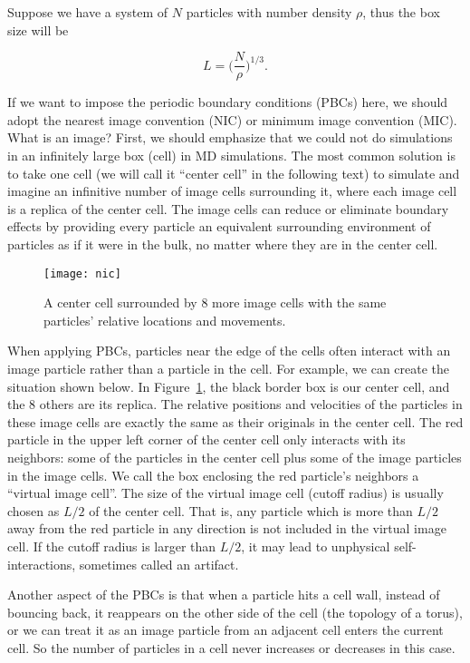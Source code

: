 \Answer
Suppose we have a system of $N$ particles with number density $\rho$, thus the
box size will be

\begin{equation}
    L = \bigg( \frac{ N }{ \rho } \bigg)^{1 / 3}.
\end{equation}

If we want to impose the periodic boundary conditions (PBCs) here, we should adopt the
nearest image convention (NIC) or minimum image convention (MIC). What is an image? First,
we should emphasize that we could not do simulations in an infinitely large box (cell) in MD
simulations. The most common solution is to take one cell (we will call it ``center cell''
in the following text) to simulate and imagine an infinitive number of image cells
surrounding it, where each image cell is a replica of the center cell. The image cells can
reduce or eliminate boundary effects by providing every particle an equivalent surrounding
environment of particles as if it were in the bulk, no matter where they are in the center
cell.

\begin{figure}[h]
    \centering
    \texttt{[image: nic]}
    \caption{A center cell surrounded by $8$ more image cells with the same
        particles' relative locations and movements.}\label{fig:nic}
\end{figure}

When applying PBCs, particles near the edge of the cells often interact
with an image particle rather than a particle in the cell. For example, we can create the
situation shown below.
In Figure~\ref{fig:nic}, the black border box is our center cell, and the $8$ others are
its replica. The relative positions and velocities of the particles in these image cells
are exactly the same as their originals in the center cell. The red particle in the
upper left corner of the center cell only interacts with its neighbors: some of the
particles in the center cell plus some of the image particles in the image cells.
We call the box enclosing the red particle's neighbors a ``virtual image cell''.
The size of the virtual image cell (cutoff radius) is usually chosen as $L / 2$
of the center cell. That is, any particle which is more than $L / 2$ away from the
red particle in any direction is not included in the virtual image cell.
If the cutoff radius is larger than $L / 2$, it may lead to
unphysical self-interactions, sometimes called an artifact.

Another aspect of the PBCs is that when a particle hits a cell wall, instead of bouncing
back, it reappears on the other side of the cell (the topology of a torus), or we can
treat it as an image particle from an adjacent cell enters the current cell.
So the number of particles in a cell never increases or decreases in this case.

